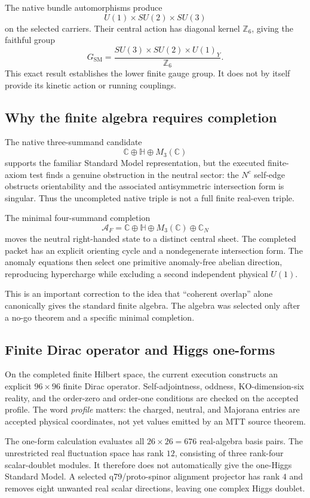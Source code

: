 \documentclass[11pt]{article}
\newcommand{\AF}{\mathcal{A}_F}
\begin{document}
The native bundle automorphisms produce
\[
 U(1)\times SU(2)\times SU(3)
\]
on the selected carriers.  Their central action has diagonal kernel
$\mathbb{Z}_6$, giving the faithful group
\[
 G_{\mathrm{SM}}
   =\frac{SU(3)\times SU(2)\times U(1)_Y}{\mathbb{Z}_6}.
\]
This exact result establishes the lower finite gauge group.  It does not by
itself provide its kinetic action or running couplings.

\subsection{Why the finite algebra requires completion}

The native three-summand candidate
\[
  \mathbb{C}\oplus\mathbb{H}\oplus M_3(\mathbb{C})
\]
supports the familiar Standard Model representation, but the executed
finite-axiom test finds a genuine obstruction in the neutral sector: the
$N^c$ self-edge obstructs orientability and the associated antisymmetric
intersection form is singular.  Thus the uncompleted native triple is not a
full finite real-even triple.

The minimal four-summand completion
\[
 \AF=
 \mathbb{C}\oplus\mathbb{H}\oplus M_3(\mathbb{C})\oplus\mathbb{C}_N
\]
moves the neutral right-handed state to a distinct central sheet.  The
completed packet has an explicit orienting cycle and a nondegenerate
intersection form.  The anomaly equations then select one primitive
anomaly-free abelian direction, reproducing hypercharge while excluding a
second independent physical $U(1)$.

This is an important correction to the idea that ``coherent overlap'' alone
canonically gives the standard finite algebra.  The algebra was selected only
after a no-go theorem and a specific minimal completion.

\subsection{Finite Dirac operator and Higgs one-forms}

On the completed finite Hilbert space, the current execution constructs an
explicit $96\times96$ finite Dirac operator.  Self-adjointness, oddness,
KO-dimension-six reality, and the order-zero and order-one conditions are
checked on the accepted profile.  The word \emph{profile} matters: the charged,
neutral, and Majorana entries are accepted physical coordinates, not yet
values emitted by an MTT source theorem.

The one-form calculation evaluates all $26\times26=676$ real-algebra basis
pairs.  The unrestricted real fluctuation space has rank $12$, consisting of
three rank-four scalar-doublet modules.  It therefore does not automatically
give the one-Higgs Standard Model.  A selected q79/proto-spinor alignment
projector has rank $4$ and removes eight unwanted real scalar directions,
leaving one complex Higgs doublet.
\end{document}
